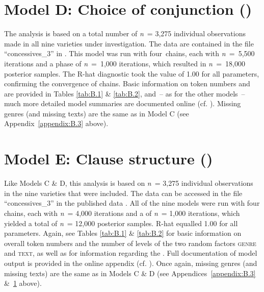 \section{Model D: Choice of conjunction ()}\label{appendix:B.4}\label{bkm:Ref41509070}

The analysis is based on a total number of \textit{n}~= 3,275 individual observations made in all nine varieties under investigation. The data are contained in the file “concessives\_3” in \citet{Schützler2021}. This model was run with four~chains, each with \textit{n~}=~5,500 iterations and a  phase of \textit{n}~=~1,000 iterations, which resulted in \textit{n~}=~18,000 posterior samples. The R-hat diagnostic took the value of 1.00 for all parameters, confirming the convergence of chains. Basic information on token numbers and  are provided in Tables \ref{tab:B.1} \& \ref{tab:B.2}, and~– as for the other models~– much more detailed model summaries are documented online (cf. ). Missing genres (and missing texts) are the same as in Model C (see Appendix~\ref{appendix:B.3} above).

\section{\label{bkm:Ref52610381}\label{bkm:Ref52610458}Model E: Clause structure ()}\label{appendix:B.5}

Like Models C \& D, this analysis is based on \textit{n}~= 3,275 individual observations in the nine varieties that were included. The data can be accessed in the file “concessives\_3” in the published data \citep{Schützler2021}. All of the nine models were run with four chains, each with \textit{n}~= 4,000 iterations and a  of \textit{n}~= 1,000 iterations, which yielded a total of \textit{n}~= 12,000 posterior samples. R-hat equalled 1.00 for all parameters. Again, see Tables \ref{tab:B.1} \& \ref{tab:B.2} for basic information on overall token numbers and the number of levels of the two random factors \textsc{genre} and \textsc{text}, as well as for information regarding the . Full documentation of model output is provided in the online appendix (cf. ). Once again, missing genres (and missing texts) are the same as in Models C \& D (see Appendices~\ref{appendix:B.3} \&~\ref{appendix:B.4} above).

